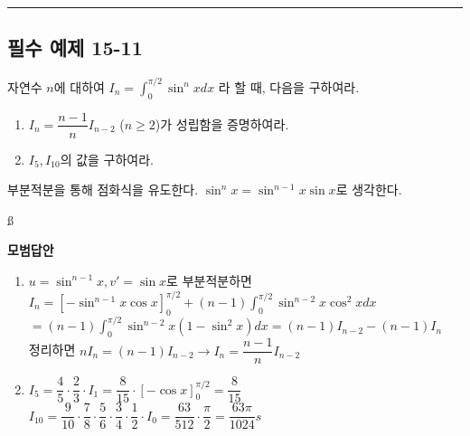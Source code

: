 \documentclass[a4paper,11pt]{article}
\begin{document}
\vspace{0.5cm}
\hrule
\vspace{0.5cm}

\subsection*{필수 예제 15-11}
자연수 $n$에 대하여 $I_n = \displaystyle\int_{0}^{\pi/2} \sin^n x dx$ 라 할 때, 다음을 구하여라.
\begin{enumerate}[label=(\arabic*)]
    \item $I_n = \dfrac{n-1}{n} I_{n-2}$ ($n \ge 2$)가 성립함을 증명하여라.
    \item $I_5, I_{10}$의 값을 구하여라.
\end{enumerate}

\begin{studybox}
부분적분을 통해 점화식을 유도한다. $\sin^n x = \sin^{n-1} x \sin x$로 생각한다.
\end{studybox}ß

\textbf{모범답안}
\begin{enumerate}[label=(\arabic*)]
    \item $u = \sin^{n-1}x, v' = \sin x$로 부분적분하면\\
    $I_n = [-\sin^{n-1}x \cos x]_0^{\pi/2} + (n-1) \int_0^{\pi/2} \sin^{n-2}x \cos^2 x dx$\\
    $= (n-1) \int_0^{\pi/2} \sin^{n-2}x (1-\sin^2 x) dx = (n-1)I_{n-2} - (n-1)I_n$\\
    정리하면 $n I_n = (n-1)I_{n-2} \to I_n = \dfrac{n-1}{n} I_{n-2}$
    \item $I_5 = \dfrac{4}{5} \cdot \dfrac{2}{3} \cdot I_1 = \dfrac{8}{15} \cdot [-\cos x]_0^{\pi/2} = \dfrac{8}{15}$\\
    $I_{10} = \dfrac{9}{10} \cdot \dfrac{7}{8} \cdot \dfrac{5}{6} \cdot \dfrac{3}{4} \cdot \dfrac{1}{2} \cdot I_0 = \dfrac{63}{512} \cdot \dfrac{\pi}{2} = \dfrac{63\pi}{1024}s$
\end{enumerate}
\end{document}
